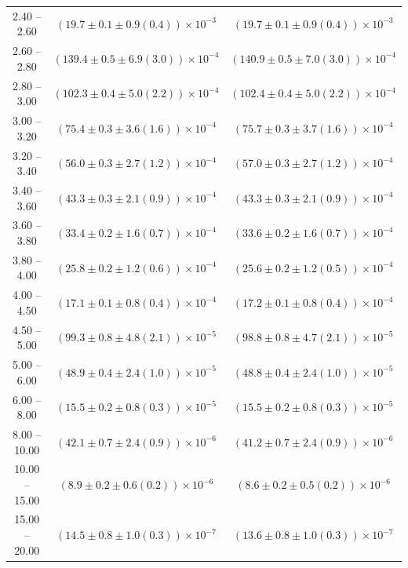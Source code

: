 \begin{table}
\begin{center}
\begin{tabular}{ c | c c }
2.40 -- 2.60 & $(19.7\pm0.1\pm0.9(0.4))\times10^{-3}$ & $(19.7\pm0.1\pm0.9(0.4))\times10^{-3}$ \\ 
2.60 -- 2.80 & $(139.4\pm0.5\pm6.9(3.0))\times10^{-4}$ & $(140.9\pm0.5\pm7.0(3.0))\times10^{-4}$ \\ 
2.80 -- 3.00 & $(102.3\pm0.4\pm5.0(2.2))\times10^{-4}$ & $(102.4\pm0.4\pm5.0(2.2))\times10^{-4}$ \\ 
3.00 -- 3.20 & $(75.4\pm0.3\pm3.6(1.6))\times10^{-4}$ & $(75.7\pm0.3\pm3.7(1.6))\times10^{-4}$ \\ 
3.20 -- 3.40 & $(56.0\pm0.3\pm2.7(1.2))\times10^{-4}$ & $(57.0\pm0.3\pm2.7(1.2))\times10^{-4}$ \\ 
3.40 -- 3.60 & $(43.3\pm0.3\pm2.1(0.9))\times10^{-4}$ & $(43.3\pm0.3\pm2.1(0.9))\times10^{-4}$ \\ 
3.60 -- 3.80 & $(33.4\pm0.2\pm1.6(0.7))\times10^{-4}$ & $(33.6\pm0.2\pm1.6(0.7))\times10^{-4}$ \\ 
3.80 -- 4.00 & $(25.8\pm0.2\pm1.2(0.6))\times10^{-4}$ & $(25.6\pm0.2\pm1.2(0.5))\times10^{-4}$ \\ 
4.00 -- 4.50 & $(17.1\pm0.1\pm0.8(0.4))\times10^{-4}$ & $(17.2\pm0.1\pm0.8(0.4))\times10^{-4}$ \\ 
4.50 -- 5.00 & $(99.3\pm0.8\pm4.8(2.1))\times10^{-5}$ & $(98.8\pm0.8\pm4.7(2.1))\times10^{-5}$ \\ 
5.00 -- 6.00 & $(48.9\pm0.4\pm2.4(1.0))\times10^{-5}$ & $(48.8\pm0.4\pm2.4(1.0))\times10^{-5}$ \\ 
6.00 -- 8.00 & $(15.5\pm0.2\pm0.8(0.3))\times10^{-5}$ & $(15.5\pm0.2\pm0.8(0.3))\times10^{-5}$ \\ 
8.00 -- 10.00 & $(42.1\pm0.7\pm2.4(0.9))\times10^{-6}$ & $(41.2\pm0.7\pm2.4(0.9))\times10^{-6}$ \\ 
10.00 -- 15.00 & $(8.9\pm0.2\pm0.6(0.2))\times10^{-6}$ & $(8.6\pm0.2\pm0.5(0.2))\times10^{-6}$ \\ 
15.00 -- 20.00 & $(14.5\pm0.8\pm1.0(0.3))\times10^{-7}$ & $(13.6\pm0.8\pm1.0(0.3))\times10^{-7}$ \\ 
\hline
\end{tabular}
\end{center}
\end{table}
 
